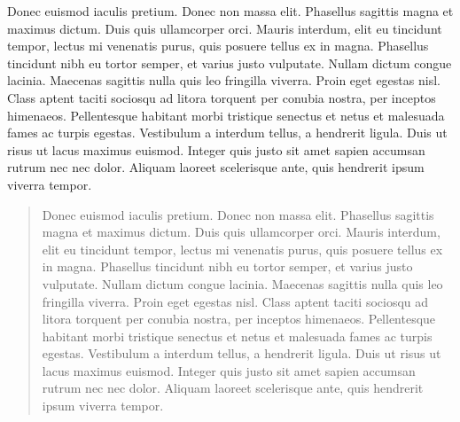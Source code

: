 \documentclass[format=acmsmall, review=false, screen=true]{acmart}
\begin{document}
Donec euismod iaculis pretium. Donec non massa elit. Phasellus sagittis magna et maximus dictum. Duis quis ullamcorper orci. Mauris interdum, elit eu tincidunt tempor, lectus mi venenatis purus, quis posuere tellus ex in magna. Phasellus tincidunt nibh eu tortor semper, et varius justo vulputate. Nullam dictum congue lacinia. Maecenas sagittis nulla quis leo fringilla viverra. Proin eget egestas nisl. Class aptent taciti sociosqu ad litora torquent per conubia nostra, per inceptos himenaeos. Pellentesque habitant morbi tristique senectus et netus et malesuada fames ac turpis egestas. Vestibulum a interdum tellus, a hendrerit ligula. Duis ut risus ut lacus maximus euismod. Integer quis justo sit amet sapien accumsan rutrum nec nec dolor. Aliquam laoreet scelerisque ante, quis hendrerit ipsum viverra tempor.

\renewcommand{\abstractname}{Acknowledgements}
\begin{abstract}
Donec euismod iaculis pretium. Donec non massa elit. Phasellus sagittis magna et maximus dictum. Duis quis ullamcorper orci. Mauris interdum, elit eu tincidunt tempor, lectus mi venenatis purus, quis posuere tellus ex in magna. Phasellus tincidunt nibh eu tortor semper, et varius justo vulputate. Nullam dictum congue lacinia. Maecenas sagittis nulla quis leo fringilla viverra. Proin eget egestas nisl. Class aptent taciti sociosqu ad litora torquent per conubia nostra, per inceptos himenaeos. Pellentesque habitant morbi tristique senectus et netus et malesuada fames ac turpis egestas. Vestibulum a interdum tellus, a hendrerit ligula. Duis ut risus ut lacus maximus euismod. Integer quis justo sit amet sapien accumsan rutrum nec nec dolor. Aliquam laoreet scelerisque ante, quis hendrerit ipsum viverra tempor.
\end{abstract}
\end{document}
